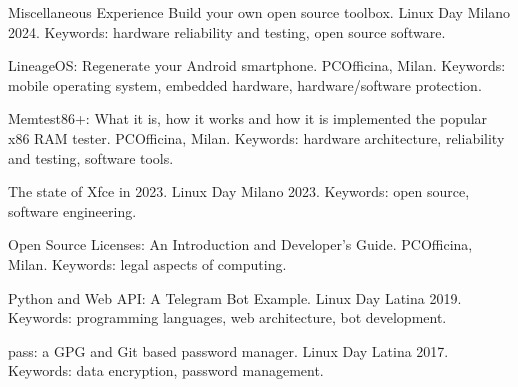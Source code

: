 \begin{rubric}{Miscellaneous Experience}
        \entry*[October 2024] Build your own open source toolbox. Linux Day Milano 2024. Keywords: hardware reliability and testing, open source software.
    
        \entry*[May 2024] LineageOS: Regenerate your Android smartphone. PCOfficina, Milan. Keywords: mobile operating system, embedded hardware, hardware/software protection.

        \entry*[December 2023] Memtest86+: What it is, how it works and how it is implemented the popular x86 RAM tester. PCOfficina, Milan. Keywords: hardware architecture, reliability and testing, software tools.

        \entry*[October 2023] The state of Xfce in 2023. Linux Day Milano 2023. Keywords: open source, software engineering.

        \entry*[July 2023] Open Source Licenses: An Introduction and Developer's Guide. PCOfficina, Milan. Keywords: legal aspects of computing.

        \entry*[October 2019] Python and Web API: A Telegram Bot Example. Linux Day Latina 2019. Keywords: programming languages, web architecture, bot development.

        \entry*[October 2017] pass: a GPG and Git based password manager. Linux Day Latina 2017. Keywords: data encryption, password management.
\end{rubric}


